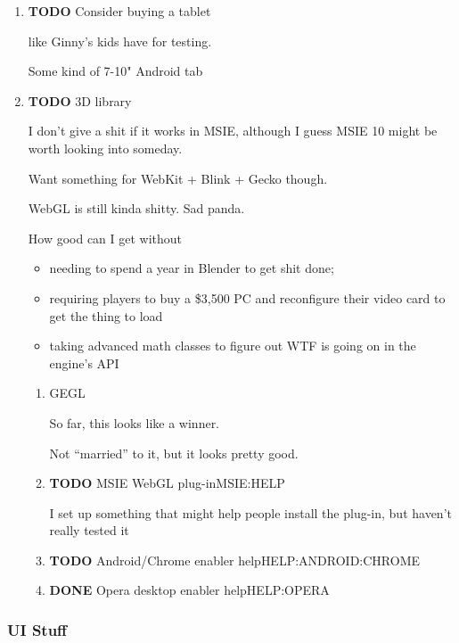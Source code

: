 \documentclass[11pt]{article}
\begin{document}
\begin{enumerate}
\item {\bfseries\sffamily TODO} Consider buying a tablet
\label{sec-1-5-1-1}

like Ginny's kids have for testing.

Some kind of 7-10" Android tab
\item {\bfseries\sffamily TODO} 3D library
\label{sec-1-5-1-2}

I don't  give a shit  if it  works in MSIE,  although I guess  MSIE 10
might be worth looking into someday.

Want something for WebKit + Blink + Gecko though.

WebGL is still kinda shitty. Sad panda.

How good can I get without

\begin{itemize}
\item needing to spend a year in Blender to get shit done;
\item requiring players to buy a \$3,500 PC and reconfigure their video
card to get the thing to load
\item taking advanced math classes to figure out WTF is going on in the
engine's API
\end{itemize}

\begin{enumerate}
\item GEGL
\label{sec-1-5-1-2-1}

So far, this looks like a winner.

Not “married” to it, but it looks pretty good.
\item {\bfseries\sffamily TODO} MSIE WebGL plug-in\hfill{}\textsc{MSIE:HELP}
\label{sec-1-5-1-2-2}

I set up something that might help people install the plug-in, but
haven't really tested it
\item {\bfseries\sffamily TODO} Android/Chrome enabler help\hfill{}\textsc{HELP:ANDROID:CHROME}
\label{sec-1-5-1-2-3}

\item {\bfseries\sffamily DONE} Opera desktop enabler help\hfill{}\textsc{HELP:OPERA}
\label{sec-1-5-1-2-4}
\end{enumerate}
\end{enumerate}
\subsubsection{UI Stuff}
\label{sec-1-5-2}
\end{document}
